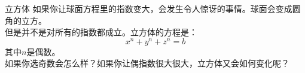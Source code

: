 ﻿\begin{surferPage}[立方体]{立方体}
如果你让球面方程里的指数变大，会发生令人惊讶的事情。球面会变成圆角的立方。\\
\vspace{0.3cm}
但是并不是对所有的指数都成立。立方体的方程是：
\[x^n+y^n+z^n=b\]
其中$n$是偶数。\\
\vspace{0.3cm}
如果你选奇数会怎么样？如果你让偶指数很大很大，立方体又会如何变化呢？
\end{surferPage}

